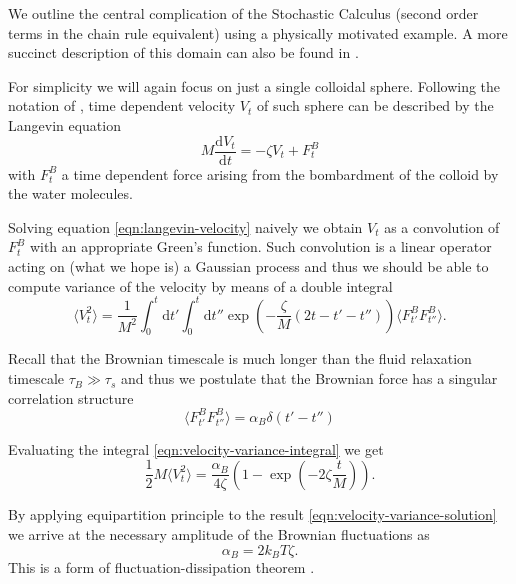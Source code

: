 \documentclass{doctoral}
\newcommand{\dd}{\mathrm{d}}
\begin{document}
We outline the central complication of the Stochastic Calculus (second order terms in the chain rule equivalent) using a physically motivated example.
A more succinct description of this domain can also be found in \textcite{Waszkiewicz_2023_pychastic}.

For simplicity we will again focus on just a single colloidal sphere.
Following the notation of \textcite{Ottinger_2012}, time dependent velocity $V_t$ of such sphere can be described by the Langevin equation
\begin{equation}
    M \frac{\dd V_t}{\dd t} = - \zeta V_t + F^{B}_t \label{eqn:langevin-velocity}
\end{equation}
with $F^B_t$ a time dependent force arising from the bombardment of the colloid by the water molecules.

Solving equation \eqref{eqn:langevin-velocity} naively we obtain $V_t$ as a convolution of $F_t^B$ with an appropriate Green's function.
Such convolution is a linear operator acting on (what we hope is) a Gaussian process and thus we should be able to compute variance of the velocity by means of a double integral
\begin{equation}
    \langle V_t^2 \rangle = \frac{1}{M^2} \int_0^t \dd t' \int_0^t \dd t'' \exp\left( - \frac{\zeta}{M} (2t - t' - t'') \right) \langle F_{t'}^B F_{t''}^B \rangle.
    \label{eqn:velocity-variance-integral}
\end{equation}

Recall that the Brownian timescale is much longer than the fluid relaxation timescale $\tau_B \gg \tau_s$ and thus we postulate that the Brownian force has a singular correlation structure
\begin{equation}
    \langle F_{t'}^B F_{t''}^B \rangle = \alpha_B \delta(t'-t'') \label{eqn:white-noise-langevin}
\end{equation}

Evaluating the integral \eqref{eqn:velocity-variance-integral} we get
\begin{equation}
    \frac{1}{2} M \langle V_t^2 \rangle = \frac{\alpha_B}{4 \zeta} (1 - \exp(-2\zeta \frac{t}{M})).
    \label{eqn:velocity-variance-solution}
\end{equation}

By applying equipartition principle to the result \eqref{eqn:velocity-variance-solution} we arrive at the necessary amplitude of the Brownian fluctuations as
\begin{equation}
    \alpha_B = 2 k_B T \zeta.
    \label{eqn:fluctuation-dissipation-raighley-particle}
\end{equation}
This is a form of fluctuation-dissipation theorem \cite{van_Kampen_1984,Ottinger_2012}.
\end{document}
